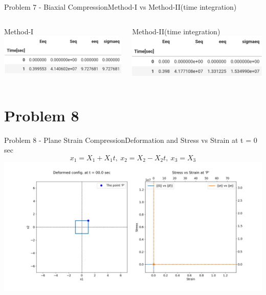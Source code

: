 \documentclass{beamer}
\begin{document}
\begin{frame}{Problem 7 - Biaxial Compression}{Method-I vs Method-II(time integration)}
    \vspace{-2em}
    \begin{columns}
        \begin{block}{\footnotesize Method-I}
            \includegraphics[width=\textwidth]{Values/m2t7.png}
        \end{block}
        \begin{block}{\footnotesize Method-II(time integration)}
            \includegraphics[width=\textwidth]{Values/m1t7.png}
        \end{block}
    \end{columns}
\end{frame}

\section{Problem 8}

\begin{frame}{Problem 8 - Plane Strain Compression}{Deformation and Stress vs Strain at t = 0 sec}
    \vspace{-1em}
    \scriptsize $$x_1 = X_1 + X_1t,\ x_2 = X_2 - X_2t,\ x_3 = X_3$$
    \includegraphics[width=\textwidth, trim={4.5cm 2cm 3cm 1cm}, clip]{Plots/ipscompression.jpg}
\end{frame}
\end{document}
